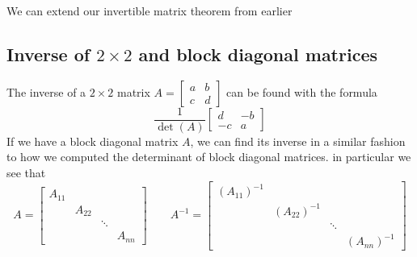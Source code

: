 \documentclass{report}
\begin{document}
We can extend our invertible matrix theorem from earlier
\subsection{Inverse of $2\times2$ and block diagonal matrices}
The inverse of a $2\times2$ matrix $A = \begin{bmatrix}a&b\\c&d\end{bmatrix}$ can be found with the formula
$$
\frac{1}{\det(A)}\begin{bmatrix}d&-b\\-c&a\end{bmatrix}
$$
If we have a block diagonal matrix $A$, we can find its inverse in a similar fashion to how we computed the determinant of block diagonal matrices. in particular we see that
$$
A = \begin{bmatrix}
A_{11}&&&\\
&A_{22}&&\\
&&\ddots&\\
&&&A_{nn}
\end{bmatrix}\qquad
A^{-1} = \begin{bmatrix}
(A_{11})^{-1}&&&\\
&(A_{22})^{-1}&&\\
&&\ddots&\\
&&&(A_{nn})^{-1}
\end{bmatrix}
$$
\end{document}
